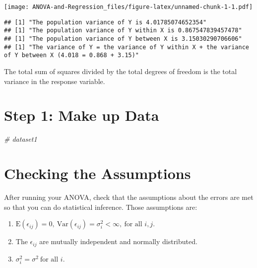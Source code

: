 \documentclass[
]{book}
\newenvironment{Shaded}{\begin{snugshade}}{\end{snugshade}}
\newcommand{\AttributeTok}[1]{\textcolor[rgb]{0.77,0.63,0.00}{#1}}
\newcommand{\CommentTok}[1]{\textcolor[rgb]{0.56,0.35,0.01}{\textit{#1}}}
\newcommand{\ConstantTok}[1]{\textcolor[rgb]{0.00,0.00,0.00}{#1}}
\newcommand{\DecValTok}[1]{\textcolor[rgb]{0.00,0.00,0.81}{#1}}
\newcommand{\FunctionTok}[1]{\textcolor[rgb]{0.00,0.00,0.00}{#1}}
\newcommand{\NormalTok}[1]{#1}
\newcommand{\SpecialCharTok}[1]{\textcolor[rgb]{0.00,0.00,0.00}{#1}}
\providecommand{\tightlist}{%
  \setlength{\itemsep}{0pt}\setlength{\parskip}{0pt}}
\begin{document}
\texttt{[image: ANOVA-and-Regression\_files/figure-latex/unnamed-chunk-1-1.pdf]}

\begin{verbatim}
## [1] "The population variance of Y is 4.01785074652354"
## [1] "The population variance of Y within X is 0.867547839457478"
## [1] "The population variance of Y between X is 3.15030290706606"
## [1] "The variance of Y = the variance of Y within X + the variance of Y between X (4.018 = 0.868 + 3.15)"
\end{verbatim}

The total sum of squares divided by the total degrees of freedom is the total variance in the response variable.

\begin{Shaded}
\end{Shaded}

\hypertarget{step-1-make-up-data}{%
\section{Step 1: Make up Data}\label{step-1-make-up-data}}

\begin{Shaded}
\begin{Highlighting}[]
\CommentTok{\# dataset1}
\end{Highlighting}
\end{Shaded}

\hypertarget{checking-the-assumptions}{%
\section{Checking the Assumptions}\label{checking-the-assumptions}}

After running your ANOVA, check that the assumptions about the errors
are met so that you can do statistical inference. Those assumptions are:

\begin{enumerate}
\def\labelenumi{\arabic{enumi}.}
\tightlist
\item
  \(\text{E}(\epsilon_{ij})=0,\ \text{Var}(\epsilon_{ij})=\sigma_{i}^2 < \infty,\ \text{for all }i, j.\)
\item
  The \(\epsilon_{ij}\) are mutually independent and normally
  distributed.
\item
  \(\sigma_{i}^2=\sigma^2\ \text{for all } i.\)
\end{enumerate}
\end{document}
